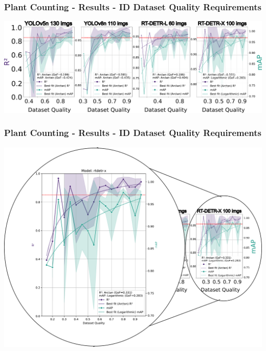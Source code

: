 \documentclass[aspectratio=43]{beamer}
\begin{document}
\begin{frame}
    \frametitle{Plant Counting - Results - ID Dataset Quality Requirements}
        
    \begin{center}
        \includegraphics[width=1\textwidth]{Imgs/r2_ap_vs_dataset_quality_2.pdf}
    \end{center}
\end{frame}
\begin{frame}
    \frametitle{Plant Counting - Results - ID Dataset Quality Requirements}
        
    \begin{center}
        \includegraphics[width=1\textwidth]{Imgs/r2_ap_vs_dataset_quality_3.pdf}
    \end{center}
\end{frame}
\end{document}
